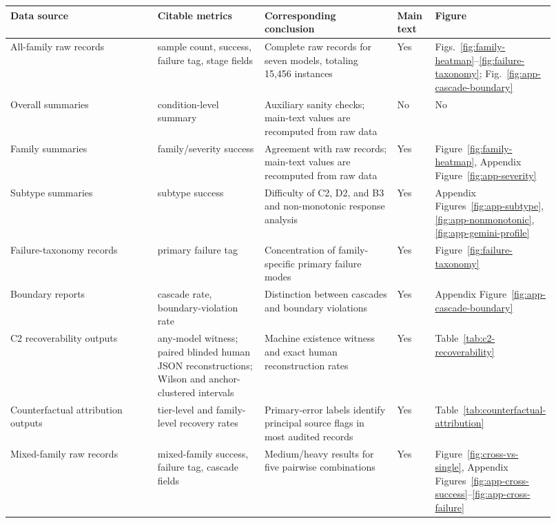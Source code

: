 \documentclass[11pt]{article}
\begin{document}
\begin{table}[htbp]
\centering
\small
\begin{adjustbox}{width=\linewidth}
\begin{tabular}{p{0.28\linewidth} p{0.20\linewidth} p{0.25\linewidth} p{0.07\linewidth} p{0.12\linewidth}}
\toprule
Data source & Citable metrics & Corresponding conclusion & Main text & Figure \\
\midrule
All-family raw records & sample count, success, failure tag, stage fields & Complete raw records for seven models, totaling 15,456 instances & Yes & Figs.~\ref{fig:family-heatmap}--\ref{fig:failure-taxonomy}; Fig.~\ref{fig:app-cascade-boundary} \\
Overall summaries & condition-level summary & Auxiliary sanity checks; main-text values are recomputed from raw data & No & No \\
Family summaries & family/severity success & Agreement with raw records; main-text values are recomputed from raw data & Yes & Figure~\ref{fig:family-heatmap}, Appendix Figure~\ref{fig:app-severity} \\
Subtype summaries & subtype success & Difficulty of C2, D2, and B3 and non-monotonic response analysis & Yes & Appendix Figures~\ref{fig:app-subtype}, \ref{fig:app-nonmonotonic}, \ref{fig:app-gemini-profile} \\
Failure-taxonomy records & primary failure tag & Concentration of family-specific primary failure modes & Yes & Figure~\ref{fig:failure-taxonomy} \\
Boundary reports & cascade rate, boundary-violation rate & Distinction between cascades and boundary violations & Yes & Appendix Figure~\ref{fig:app-cascade-boundary} \\
C2 recoverability outputs & any-model witness; paired blinded human JSON reconstructions; Wilson and anchor-clustered intervals & Machine existence witness and exact human reconstruction rates & Yes & Table~\ref{tab:c2-recoverability} \\
Counterfactual attribution outputs & tier-level and family-level recovery rates & Primary-error labels identify principal source flags in most audited records & Yes & Table~\ref{tab:counterfactual-attribution} \\
Mixed-family raw records & mixed-family success, failure tag, cascade fields & Medium/heavy results for five pairwise combinations & Yes & Figure~\ref{fig:cross-vs-single}, Appendix Figures~\ref{fig:app-cross-success}--\ref{fig:app-cross-failure} \\

\end{tabular}
\end{adjustbox}
\end{table}
\end{document}
